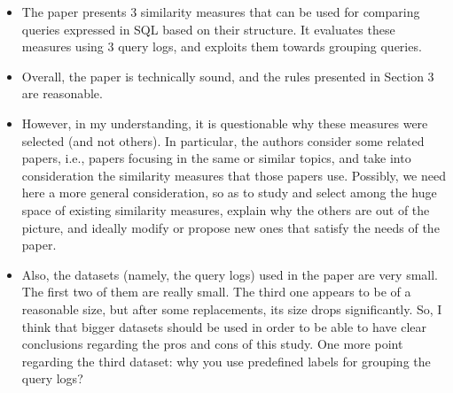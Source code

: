\begin{itemize}

\item The paper presents 3 similarity measures that can be used for comparing queries expressed in SQL based on their structure. It evaluates these measures using 3 query logs, and exploits them towards grouping queries. 


\item Overall, the paper is technically sound, and the rules presented in Section 3 are reasonable. 


\item However, in my understanding, it is questionable why these measures were selected (and not others). In particular, the authors consider some related papers, i.e., papers focusing in the same or similar topics, and take into consideration the similarity measures that those papers use. Possibly, we need here a more general consideration, so as to study and select among the huge space of existing similarity measures, explain why the others are out of the picture, and ideally modify or propose new ones that satisfy the needs of the paper.


\item Also, the datasets (namely, the query logs) used in the paper are very small. 
The first two of them are really small. The third one appears to be of a reasonable size, but after some replacements, its size drops significantly. 
So, I think that bigger datasets should be used in order to be able to have clear conclusions regarding the pros and cons of this study. 
One more point regarding the third dataset: why you use predefined labels for grouping the query logs? 


\end{itemize}
